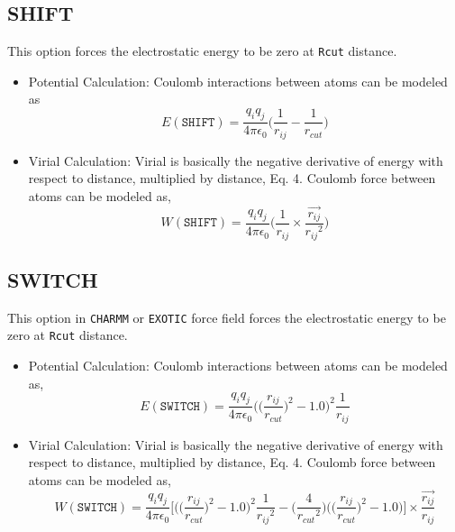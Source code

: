 \subsection{SHIFT} This option forces the electrostatic energy to be zero at \texttt{Rcut} distance.
\begin{itemize}
\item Potential Calculation: Coulomb interactions between atoms can be modeled as
	\begin{equation}
		E(\texttt{SHIFT}) = \frac{q_i q_j}{4\pi \epsilon_0} \Big( \frac{1}{r_{ij}} - \frac{1}{r_{cut}} \Big)
	\end{equation}	
\item Virial Calculation: Virial is basically the negative derivative of energy with respect to distance, multiplied by distance, Eq. 4. Coulomb force between atoms can be modeled as,\\
	\begin{equation}
		W(\texttt{SHIFT}) = \frac{q_i q_j}{4\pi \epsilon_0} \Big( \frac{1}{r_{ij}} \times \frac{\overrightarrow{r_{ij}}}{{r_{ij}}^2} \Big)
	\end{equation}	
\end{itemize}

\subsection{SWITCH} This option in \texttt{CHARMM} or \texttt{EXOTIC} force field forces the electrostatic energy to be zero at \texttt{Rcut} distance.
\begin{itemize}
	\item Potential Calculation: Coulomb interactions between atoms can be modeled as,
	\begin{equation}
		E(\texttt{SWITCH}) = \frac{q_i q_j}{4\pi \epsilon_0} \bigg( \Big(\frac{r_{ij}}{r_{cut}} \Big)^2 - 1.0\bigg)^2 \frac{1}{r_{ij}}
	\end{equation}
	
	\item Virial Calculation: Virial is basically the negative derivative of energy with respect to distance, multiplied by distance, Eq. 4. Coulomb force between atoms can be modeled as,\\
	\begin{equation}
		W(\texttt{SWITCH}) = \frac{q_i q_j}{4\pi \epsilon_0} \Bigg[ \bigg( \Big(\frac{r_{ij}}{r_{cut}} \Big)^2 - 1.0\bigg)^2 \frac{1}{{r_{ij}}^2} - \bigg( \frac{4}{{r_{cut}}^2} \bigg) \bigg( \Big(\frac{r_{ij}}{r_{cut}} \Big)^2 - 1.0\bigg) \Bigg] \times \frac{\overrightarrow{r_{ij}}}{r_{ij}}
	\end{equation}	
\end{itemize}

